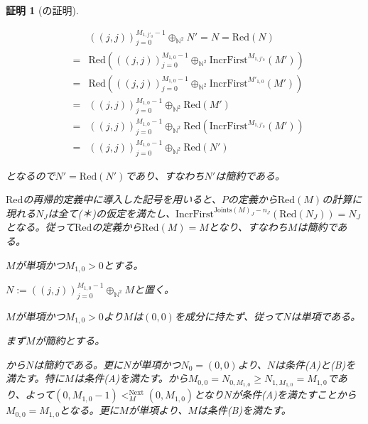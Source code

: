 \documentclass[dvipdfmx,uplatex]{jsarticle}
\theoremstyle{customnonumberbreakfortheorem}
\theoremstyle{customnonumberbreakforproof}
\newtheorem{hideableproof}{証明}
\begin{document}
\begin{hideableproof}[の証明]
\begin{indented}
\begin{indented}
\begin{indented}
\begin{indented}
					\begin{eqnarray*}
					& & ((j,j))_{j=0}^{M_{1,j'_0}-1} \oplus_{\mathbb{N}^2} N' = N = \textrm{Red}(N) \\
					& = & \textrm{Red}(((j,j))_{j=0}^{M_{1,0}-1} \oplus_{\mathbb{N}^2} \textrm{IncrFirst}^{M_{1,j'_0}}(M')) \\
					& = & \textrm{Red}(((j,j))_{j=0}^{M_{1,0}-1} \oplus_{\mathbb{N}^2} \textrm{IncrFirst}^{M'_{1,0}}(M')) \\
					& = & ((j,j))_{j=0}^{M_{1,0}-1} \oplus_{\mathbb{N}^2} \textrm{Red}(M') \\
					& = & ((j,j))_{j=0}^{M_{1,0}-1} \oplus_{\mathbb{N}^2} \textrm{Red}(\textrm{IncrFirst}^{M_{1,j'_0}}(M')) \\
					& = & ((j,j))_{j=0}^{M_{1,0}-1} \oplus_{\mathbb{N}^2} \textrm{Red}(N')
					\end{eqnarray*}
					\item となるので\(N' = \textrm{Red}(N')\)であり、すなわち\(N'\)は簡約である。
				\end{indented}
				\item \(\textrm{Red}\)の再帰的定義中に導入した記号を用いると、\(P\)の定義から\(\textrm{Red}(M)\)の計算に現れる\(N_J\)は全て(＊)の仮定を満たし、\(\textrm{IncrFirst}^{\textrm{Joints}(M)_J-n_J}(\textrm{Red}(N_J)) = N_J\)となる。従って\(\textrm{Red}\)の定義から\(\textrm{Red}(M) = M\)となり、すなわち\(M\)は簡約である。
			\end{indented}
		\end{indented}
		\item \(M\)が単項かつ\(M_{1,0} > 0\)とする。
		\begin{indented}
			\item \(N := ((j,j))_{j=0}^{M_{1,0}-1} \oplus_{\mathbb{N}^2} M\)と置く。
			\item \(M\)が単項かつ\(M_{1,0} > 0\)より\(M\)は\((0,0)\)を成分に持たず、従って\(N\)は単項である。
			\item まず\(M\)が簡約とする。
			\begin{indented}
				\item {}から\(N\)は簡約である。更に\(N\)が単項かつ\(N_0 = (0,0)\)より、\(N\)は条件(A)と(B)を満たす。特に\(M\)は条件(A)を満たす。から\(M_{0,0} = N_{0,M_{1,0}} \geq N_{1,M_{1,0}} = M_{1,0}\)であり、よって\((0,M_{1,0}-1) <_M^{\textrm{Next}} (0,M_{1,0})\)となり\(N\)が条件(A)を満たすことから\(M_{0,0} = M_{1,0}\)となる。更に\(M\)が単項より、\(M\)は条件(B)を満たす。
			\end{indented}

\end{indented}
\end{indented}
\end{hideableproof}
\end{document}
